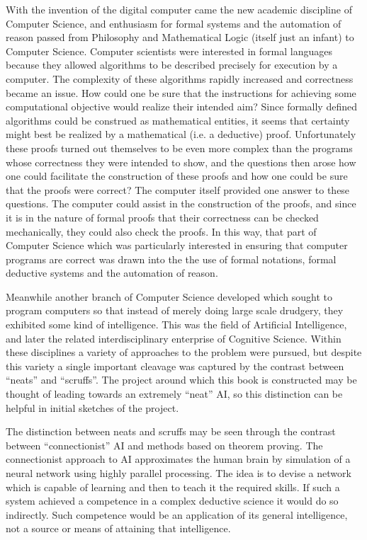 With the invention of the digital computer came the new academic
discipline of Computer Science, and enthusiasm for formal systems and
the automation of reason passed from Philosophy and Mathematical Logic
(itself just an infant) to Computer Science.
Computer scientists were interested in formal languages because they
allowed algorithms to be described precisely for execution by a computer.
The complexity of these algorithms rapidly increased and correctness
became an issue.
How could one be sure that the instructions for achieving some
computational objective would realize their intended aim?
Since formally defined algorithms could be construed as mathematical
entities, it seems that certainty might best be realized by a
mathematical (i.e. a deductive) proof.
Unfortunately these proofs turned out themselves to be even more
complex than the programs whose correctness they were intended to
show, and the questions then arose how one could facilitate the
construction of these proofs and how one could be sure that the proofs
were correct?
The computer itself provided one answer to these questions.
The computer could assist in the construction of the proofs, and since
it is in the nature of formal proofs that their correctness can be
checked mechanically, they could also check the proofs.
In this way, that part of Computer Science which was particularly
interested in ensuring that computer programs are correct was drawn
into the the use of formal notations, formal deductive systems and the
automation of reason.

Meanwhile another branch of Computer Science developed which sought to
program computers so that instead of merely doing large scale
drudgery, they exhibited some kind of intelligence.
This was the field of Artificial Intelligence, and later the related
interdisciplinary enterprise of Cognitive Science.
Within these disciplines a variety of approaches to the problem were
pursued, but despite this variety a single important cleavage was
captured by the contrast between ``neats'' and ``scruffs''.
The project around which this book is constructed may be thought of
leading towards an extremely ``neat'' AI, so this distinction can be
helpful in initial sketches of the project.

The distinction between neats and scruffs may be seen through the
contrast between ``connectionist'' AI and methods based on theorem proving.
The connectionist approach to AI approximates the human brain by
simulation of a neural network using highly parallel processing.
The idea is to devise a network which is capable of learning and then
to teach it the required skills.
If such a system achieved a competence in a complex deductive science
it would do so indirectly.
Such competence would be an application of its general intelligence,
not a source or means of attaining that intelligence.

